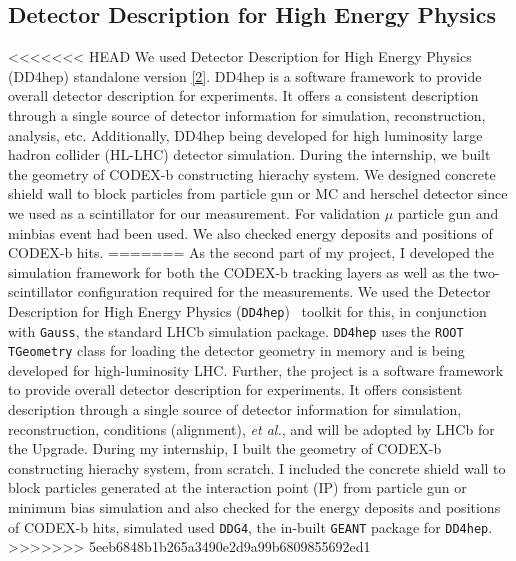 \subsection{Detector Description for High Energy Physics}
<<<<<<< HEAD
We used Detector Description for High Energy Physics (DD4hep) standalone version \href{https://dd4hep.web.cern.ch/dd4hep/}{[2]}.
DD4hep is a software framework to provide overall detector description for experiments.
It offers a consistent description through a single source of detector information for simulation, reconstruction, analysis, etc.
Additionally, DD4hep being developed for high luminosity large hadron collider (HL-LHC) detector simulation.
During the internship, we built the geometry of CODEX-b constructing hierachy system.
We designed concrete shield wall to block particles from particle gun or MC and herschel detector since we used as a scintillator for our measurement.
For validation $\mu$ particle gun and minbias event had been used.
We also checked energy deposits and positions of CODEX-b hits. 
=======
As the second part of my project, I developed the simulation framework for both the CODEX-b tracking layers as well as the two-scintillator configuration required for the measurements. We used the Detector Description for High Energy Physics ({\tt DD4hep})~\cite{dd4hep} toolkit for this, in conjunction with {\tt Gauss}, the standard LHCb simulation package. {\tt DD4hep} uses the {\tt ROOT} {\tt TGeometry} class for loading the detector geometry in memory and is being developed for high-luminosity LHC. Further, the project is a software framework to provide overall detector description for experiments. It offers consistent description through a single source of detector information for simulation, reconstruction, conditions (alignment), {\em et al.}, and will be adopted by LHCb for the Upgrade. During my internship, I built the geometry of CODEX-b constructing hierachy system, from scratch. I included the concrete shield wall to block particles generated at the interaction point (IP) from particle gun or minimum bias simulation and also checked for the energy deposits and positions of CODEX-b hits, simulated used {\tt DDG4}, the in-built {\tt GEANT} package for {\tt DD4hep}. 
>>>>>>> 5eeb6848b1b265a3490e2d9a99b6809855692ed1



